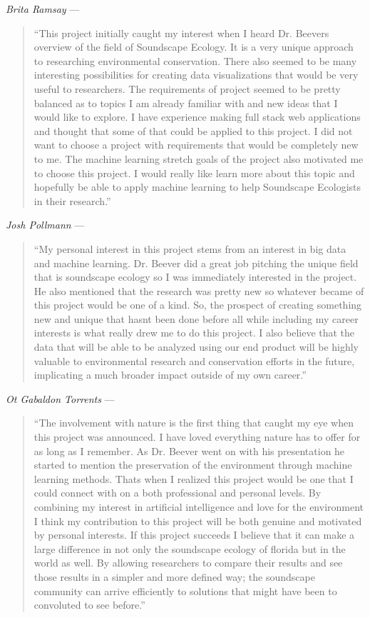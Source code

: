 \noindent\textit{Brita Ramsay} ---
\begin{quote}
``This project initially caught my interest when I heard Dr. Beever\textquotesingle s overview of the field of Soundscape Ecology. It is a very unique approach to researching environmental conservation. There also seemed to be many interesting possibilities for creating data visualizations that would be very useful to researchers. The requirements of project seemed to be pretty balanced as to topics I am already familiar with and new ideas that I would like to explore. I have experience making full stack web applications and thought that some of that could be applied to this project. I did not want to choose a project with requirements that would be completely new to me. The machine learning stretch goals of the project also motivated me to choose this project. I would really like learn more about this topic and hopefully be able to apply machine learning to help Soundscape Ecologists in their research.''
\end{quote}

\noindent\textit{Josh Pollmann} ---
\begin{quote}
``My personal interest in this project stems from an interest in big data and machine learning. Dr. Beever did a great job pitching the unique field that is soundscape ecology so I was immediately interested in the project. He also mentioned that the research was pretty new so whatever became of this project would be one of a kind. So, the prospect of creating something new and unique that hasn\textquotesingle t been done before all while including my career interests is what really drew me to do this project. I also believe that the data that will be able to be analyzed using our end product will be highly valuable to environmental research and conservation efforts in the future, implicating a much broader impact outside of my own career.''
\end{quote}

\noindent\textit{Ot Gabaldon Torrents} ---
\begin{quote}
``The involvement with nature is the first thing that caught my eye when this project was announced. I have loved everything nature has to offer for as long as I remember. As Dr. Beever went on with his presentation he started to mention the preservation of the environment through machine learning methods. That\textquotesingle s when I realized this project would be one that I could connect with on a both professional and personal levels. By combining my interest in artificial intelligence and love for the environment I think my contribution to this project will be both genuine and motivated by personal interests. If this project succeeds I believe that it can make a large difference in not only the soundscape ecology of florida but in the world as well. By allowing researchers to compare their results and see those results in a simpler and more defined way; the soundscape community can arrive efficiently to solutions that might have been to convoluted to see before.''
\end{quote}
